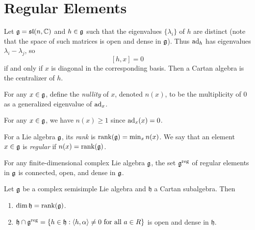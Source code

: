 \section{Regular Elements}

\begin{example}
  Let $\mathfrak{g} = \mathfrak{sl}(n, \mathbb{C})$
  and $h \in \mathfrak{g}$ such that the eigenvalues
  $\{\lambda_i\}$
  of $h$ are distinct (note that the
  space of such matrices is open and
  dense in $\mathfrak{g}$). Thus
  $\operatorname{ad}_h$ has eigenvalues
  $\lambda_i - \lambda_j$, so
  \[
    [h, x] = 0
  \]
  if and only if $x$ is diagonal in the
  corresponding basis. Then a Cartan
  algebra is the centralizer of $h$.
\end{example}

\begin{definition}
  For any $x \in \mathfrak{g}$, define
  the \emph{nullity} of $x$, denoted
  $n(x)$, to be the multiplicity
  of $0$ as a generalized eigenvalue of
  $\operatorname{ad}_x$.
\end{definition}

\begin{remark}
  For any $x \in \mathfrak{g}$, we have
  $n(x) \ge 1$ since
  $\operatorname{ad}_x(x) = 0$.
\end{remark}

\begin{definition}
  For a Lie algebra $\mathfrak{g}$,
  its \emph{rank} is
  $\operatorname{rank}(\mathfrak{g}) = \min_x n(x)$. We say that an
  element $x \in \mathfrak{g}$ is
  \emph{regular} if $n(x) = \operatorname{rank}(\mathfrak{g})$.
\end{definition}

\pagebreak
\begin{lemma}
  For any finite-dimensional complex
  Lie algebra $\mathfrak{g}$, the set $\mathfrak{g}^{\mathrm{reg}}$
  of regular elements in $\mathfrak{g}$ is
  connected, open, and dense in $\mathfrak{g}$.
\end{lemma}

\begin{prop}
  Let $\mathfrak{g}$ be a complex semisimple
  Lie algebra and
  $\mathfrak{h}$ a Cartan subalgebra.
  Then
  \begin{enumerate}
    \item $\dim \mathfrak{h} = \operatorname{rank}(\mathfrak{g})$.
    \item $\mathfrak{h} \cap \mathfrak{g}^{\mathrm{reg}} = \{h \in \mathfrak{h} : \langle h, \alpha \rangle \ne 0 \text{ for all } a \in R\}$
      is open and dense in
      $\mathfrak{h}$.
  \end{enumerate}
\end{prop}
